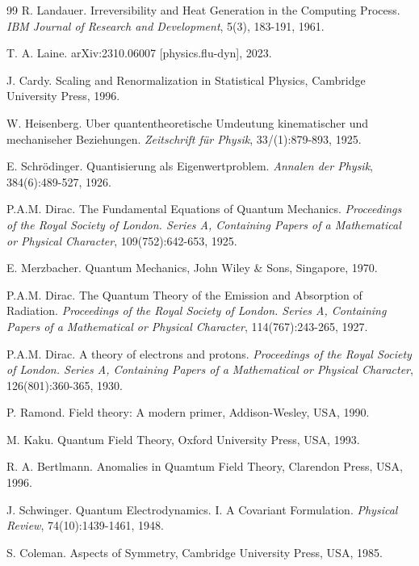 \documentclass[prd,amsmath,amssymb,12pt]{revtex4}
\begin{document}
\begin{thebibliography}{99}
    R. Landauer.
    Irreversibility and Heat Generation in the Computing Process.
    {\em IBM Journal of Research and Development}, 5(3), 183-191, 1961.

    T. A. Laine.
    arXiv:2310.06007 [physics.flu-dyn], 2023.

    J. Cardy.
    Scaling and Renormalization in Statistical Physics, Cambridge University Press, 1996.

    W. Heisenberg.
    Uber quantentheoretische Umdeutung kinematischer und mechaniseher Beziehungen.
    {\em Zeitschrift für Physik}, 33/(1):879-893, 1925.

    E. Schrödinger.
    Quantisierung als Eigenwertproblem.
    {\em Annalen der Physik}, 384(6):489-527, 1926.

    P.A.M. Dirac.
    The Fundamental Equations of Quantum Mechanics.
    {\em Proceedings of the Royal Society of London. Series A, Containing Papers of a Mathematical or Physical
    Character}, 109(752):642-653, 1925.

    E. Merzbacher.
    Quantum Mechanics, John Wiley \& Sons, Singapore, 1970.

    P.A.M. Dirac.
    The Quantum Theory of the Emission and Absorption of Radiation.
    {\em Proceedings of the Royal Society of London. Series A, Containing Papers of a Mathematical or Physical
    Character}, 114(767):243-265, 1927.

    P.A.M. Dirac.
    A theory of electrons and protons.
    {\em Proceedings of the Royal Society of London. Series A, Containing Papers of a Mathematical or Physical
    Character}, 126(801):360-365, 1930.

    P. Ramond.
    Field theory: A modern primer, Addison-Wesley, USA, 1990.

    M. Kaku.
    Quantum Field Theory, Oxford University Press, USA, 1993.

    R. A. Bertlmann.
    Anomalies in Quamtum Field Theory, Clarendon Press, USA, 1996.

    J. Schwinger.
    Quantum Electrodynamics. I. A Covariant Formulation.
    {\em Physical Review}, 74(10):1439-1461, 1948.

    S. Coleman.
    Aspects of Symmetry, Cambridge University Press, USA, 1985.


\end{thebibliography}
\end{document}
